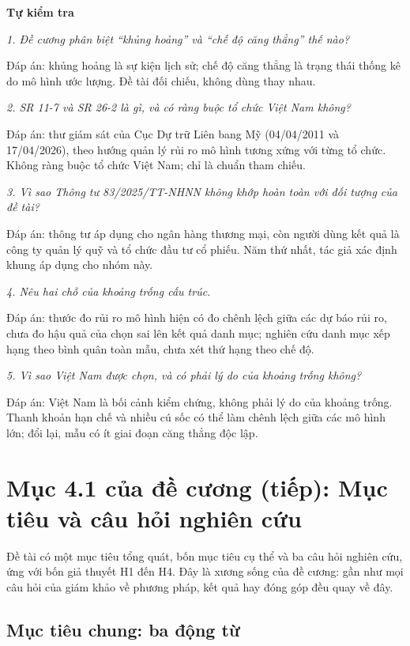 \textbf{Tự kiểm tra}

{\itshape 1. Đề cương phân biệt “khủng hoảng” và “chế độ căng thẳng” thế nào?\par}

Đáp án: khủng hoảng là sự kiện lịch sử; chế độ căng thẳng là trạng thái thống kê do mô hình ước lượng. Đề tài đối chiếu, không dùng thay nhau.

{\itshape 2. SR 11-7 và SR 26-2 là gì, và có ràng buộc tổ chức Việt Nam không?\par}

Đáp án: thư giám sát của Cục Dự trữ Liên bang Mỹ (04/04/2011 và 17/04/2026), theo hướng quản lý rủi ro mô hình tương xứng với từng tổ chức. Không ràng buộc tổ chức Việt Nam; chỉ là chuẩn tham chiếu.

{\itshape 3. Vì sao Thông tư 83/2025/TT-NHNN không khớp hoàn toàn với đối tượng của đề tài?\par}

Đáp án: thông tư áp dụng cho ngân hàng thương mại, còn người dùng kết quả là công ty quản lý quỹ và tổ chức đầu tư cổ phiếu. Năm thứ nhất, tác giả xác định khung áp dụng cho nhóm này.

{\itshape 4. Nêu hai chỗ của khoảng trống cấu trúc.\par}

Đáp án: thước đo rủi ro mô hình hiện có đo chênh lệch giữa các dự báo rủi ro, chưa đo hậu quả của chọn sai lên kết quả danh mục; nghiên cứu danh mục xếp hạng theo bình quân toàn mẫu, chưa xét thứ hạng theo chế độ.

{\itshape 5. Vì sao Việt Nam được chọn, và có phải lý do của khoảng trống không?\par}

Đáp án: Việt Nam là bối cảnh kiểm chứng, không phải lý do của khoảng trống. Thanh khoản hạn chế và nhiều cú sốc có thể làm chênh lệch giữa các mô hình lớn; đổi lại, mẫu có ít giai đoạn căng thẳng độc lập.

\chapter{Mục 4.1 của đề cương (tiếp): Mục tiêu và câu hỏi nghiên cứu}

Đề tài có một mục tiêu tổng quát, bốn mục tiêu cụ thể và ba câu hỏi nghiên cứu, ứng với bốn giả thuyết H1 đến H4. Đây là xương sống của đề cương: gần như mọi câu hỏi của giám khảo về phương pháp, kết quả hay đóng góp đều quay về đây.

\section{Mục tiêu chung: ba động từ}

